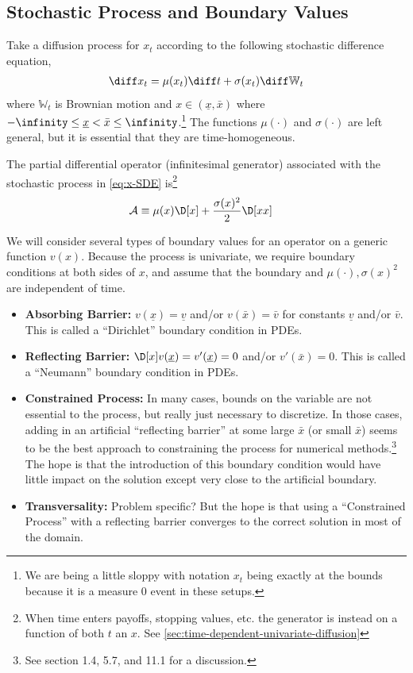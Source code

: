 \documentclass[11pt]{etk-article}
\begin{document}
\subsection{Stochastic Process and Boundary Values}
Take a diffusion process for $x_t$ according to the following stochastic difference equation,
\begin{align}
\diff x_t = \mu(x_t)\diff t + \sigma(x_t)\diff\mathbb{W}_t\label{eq:x-SDE}
\end{align}
where $\mathbb{W}_t$ is Brownian motion and $x \in (\underline{x}, \bar{x})$ where $-\infinity \leq \underline{x} < \bar{x} \leq \infinity$.\footnote{We are being a little sloppy with notation $x_t$ being exactly at the bounds because it is a measure $0$ event in these setups.}  The functions $\mu(\cdot)$ and $\sigma(\cdot)$ are left general, but it is essential that they are time-homogeneous.

The partial differential operator (infinitesimal generator) associated with the stochastic process in \cref{eq:x-SDE} is\footnote{When time enters payoffs, stopping values, etc. the generator is instead on a function of both $t$ an $x$.  See \cref{sec:time-dependent-univariate-diffusion}}
\begin{align}
	\mathcal{A} &\equiv \mu(x)\D[x] + \frac{\sigma(x)^2}{2}\D[xx]\label{eq:A-generator-univariate-diffusion}
\end{align}

We will consider several types of boundary values for an operator on a generic function $v(x)$.  Because the process is univariate, we require boundary conditions at both sides of $x$, and assume that the boundary and $\mu(\cdot), \sigma(x)^2$ are independent of time.
\begin{itemize}
	\item \textbf{Absorbing Barrier:}   $v(\underline{x}) = \underline{v}$ and/or $v(\bar{x}) = \bar{v}$ for constants $\underline{v}$ and/or $\bar{v}$.  This is called a ``Dirichlet'' boundary condition in PDEs. 
	\item \textbf{Reflecting Barrier:} $\D[x]v(\underline{x}) = v'(\underline{x})=0$ and/or $v'(\bar{x}) = 0$.  This is called a ``Neumann'' boundary condition in PDEs. 
	\item \textbf{Constrained Process:}  In many cases, bounds on the variable are not essential to the process, but really just necessary to discretize.  In those cases, adding in an artificial ``reflecting barrier'' at some large $\bar{x}$ (or small $\bar{x}$) seems to be the best approach to constraining the process for numerical methods.\footnote{See \cite{KushnerDupuis2001} section 1.4, 5.7, and 11.1 for a discussion.}  The hope is that the introduction of this boundary condition would have little impact on the solution except very close to the artificial boundary.
	\item \textbf{Transversality:} Problem specific?  But the hope is that using a ``Constrained Process'' with a reflecting barrier converges to the correct solution in most of the domain.
\end{itemize}
\end{document}
